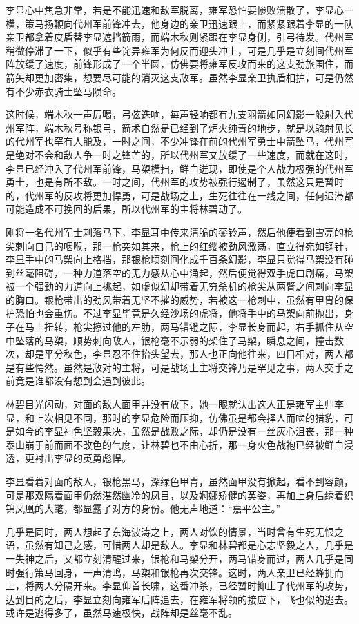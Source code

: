 李显心中焦急非常，若是不能迅速和敌军脱离，雍军恐怕要惨败溃散了，李显心一横，策马扬鞭向代州军前锋冲去，他身边的亲卫迅速跟上，而紧紧跟着李显的一队亲卫都拿着皮盾替李显遮挡箭雨，而端木秋则紧跟在李显身侧，引弓待发。代州军稍微停滞了一下，似乎有些诧异雍军为何反而迎头冲上，可是几乎是立刻间代州军阵放缓了速度，前锋形成了一个半圆，仿佛要将雍军反攻而来的这支劲旅围住，而箭矢却更加密集，想要尽可能的消灭这支敌军。虽然李显亲卫执盾相护，可是仍然有不少赤衣骑士坠马陨命。

这时候，端木秋一声厉喝，弓弦迭响，每声轻响都有九支羽箭如同幻影一般射入代州军阵，端木秋号称银弓，箭术自然是已经到了炉火纯青的地步，就是以骑射见长的代州军也罕有人能及，一时之间，不少冲锋在前的代州军勇士中箭坠马，代州军是绝对不会和敌人争一时之锋芒的，所以代州军又放缓了一些速度，而就在这时，李显已经冲入了代州军前锋，马槊横扫，鲜血迸现，即使是个人战力极强的代州军勇士，也是有所不敌。一时之间，代州军的攻势被强行遏制了，虽然这只是暂时的，代州军的反攻将更加悍勇，可是战场之上，生死往往在一线之间，任何迟滞都可能造成不可挽回的后果，所以代州军的主将林碧动了。

刚将一名代州军士刺落马下，李显耳中传来清脆的銮铃声，然后他便看到雪亮的枪尖刺向自己的咽喉，那一枪突如其来，枪上的红缨被劲风激荡，直立得宛如钢针，李显手中的马槊向上格挡，那银枪顷刻间化成千百条幻影，李显只觉得马槊没有碰到丝毫阻碍，一种力道落空的无力感从心中涌起，然后便觉得双手虎口剧痛，马槊被一个强劲的力道向上挑起，如虚似幻却带着无穷杀机的枪尖从两臂之间刺向李显的胸口。银枪带出的劲风带着无坚不摧的威势，若被这一枪刺中，虽然有甲胄的保护恐怕也会重伤。不过李显毕竟是久经沙场的虎将，他将手中的马槊向前抛出，身子在马上扭转，枪尖擦过他的左肋，两马错镫之际，李显长身而起，右手抓住从空中坠落的马槊，顺势刺向敌人，银枪毫不示弱的架住了马槊，瞬息之间，撞击数次，却是平分秋色，李显忍不住抬头望去，那人也正向他往来，四目相对，两人都是有些愕然。虽然是敌对的主将，可是战场上主将交锋乃是罕见之事，两人交手之前竟是谁都没有想到会遇到彼此。

林碧目光闪动，对面的敌人面甲并没有放下，她一眼就认出这人正是雍军主帅李显，和上次相见不同，那时的李显危险而压抑，仿佛虽是都会择人而啮的猎豹，可是如今的李显神色坚毅果决，虽然是战败之际，却仍是没有一丝灰心沮丧，那一种泰山崩于前而面不改色的气度，让林碧也不由心折，那一身火色战袍已经被鲜血浸透，更衬出李显的英勇彪悍。

李显看着对面的敌人，银枪黑马，深绿色甲胄，虽然面甲没有掀起，看不到容颜，可是那双隔着面甲仍然湛然幽冷的凤目，以及婀娜矫健的英姿，再加上身后绣着织锦凤凰的大氅，都显露了对方的身份。他无声地道：“嘉平公主。”

几乎是同时，两人想起了东海波涛之上，两人对饮的情景，当时曾有生死无恨之语，虽然有知己之感，可惜两人却是敌人。李显和林碧都是心志坚毅之人，几乎是一失神之后，又都立刻清醒过来，银枪和马槊分开，两马错身而过，两人几乎是同时强行策马回身，一声清鸣，马槊和银枪再次交锋。这时，两人亲卫已经蜂拥而上，将两人分隔开来。李显仰首长啸，这番冲杀，已经暂时抑止了代州军的攻势，达到目的之后，李显立刻向雍军后阵追去，在雍军将领的接应下，飞也似的逃去。或许是逃得多了，虽然马速极快，战阵却是丝毫不乱。

